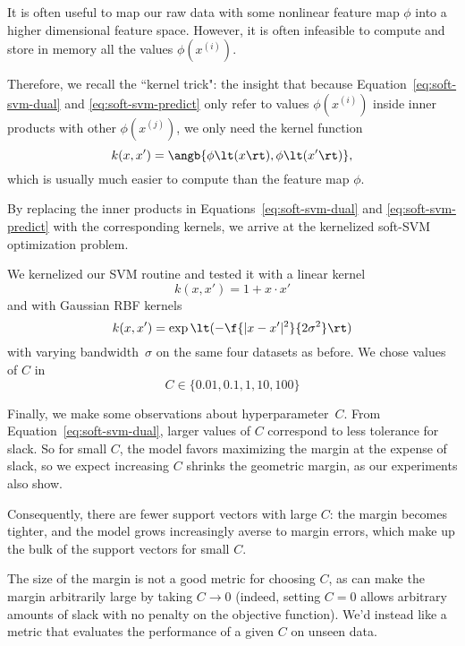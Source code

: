 \documentclass{article}
\newcommand{\sind}[1]{^{(#1)}}
\begin{document}
\begin{multicols}{2}
It is often useful to map our raw data
with some nonlinear feature map $\phi$
into a higher dimensional feature space.
However, it is often infeasible to compute and store in memory
all the values $\phi(x\sind{i})$.

Therefore, we recall the ``kernel trick": the insight that
because Equation~\ref{eq:soft-svm-dual} and \ref{eq:soft-svm-predict}
only refer to values $\phi(x\sind{i})$ inside inner products
with other $\phi(x\sind{j})$,
we only need the kernel function
\begin{equation}
    k(x, x') = \angb{\phi\lt(x\rt), \phi\lt(x'\rt)},
\end{equation}
which is usually much easier to compute than the feature map $\phi$.

By replacing the inner products in
Equations~\ref{eq:soft-svm-dual} and \ref{eq:soft-svm-predict}
with the corresponding kernels,
we arrive at the kernelized soft-SVM optimization problem.

We kernelized our SVM routine
and tested it with a linear kernel
\begin{equation}
    k(x, x') = 1 + x\cdot x'
\end{equation}
and with Gaussian RBF kernels
\begin{equation}
    k(x, x') = \exp\lt(-\f{|x - x'|^2}{2\sigma^2}\rt)
\end{equation}
with varying bandwidth~$\sigma$ on the same four datasets as before.  %
We chose values of $C$ in
\[
    C \in \{0.01, 0.1, 1, 10, 100\}
\]


Finally, we make some observations about hyperparameter~$C$.
From Equation~\ref{eq:soft-svm-dual},
larger values of $C$ correspond to less tolerance for slack.
So for small $C$,
the model favors
maximizing the margin at the expense of slack,
so we expect increasing $C$ shrinks the geometric margin,
as our experiments also show.

Consequently, there are fewer support vectors with large $C$:
the margin becomes tighter,
and the model grows increasingly averse to margin errors,
which make up the bulk of the support vectors for small $C$.

The size of the margin
is not a good metric for choosing $C$,
as can make the margin arbitrarily large
by taking $C \to 0$
(indeed, setting $C = 0$ allows arbitrary amounts of slack
with no penalty on the objective function).
We'd instead like a metric that evaluates
the performance of a given $C$
on unseen data.


\end{multicols}
\end{document}
